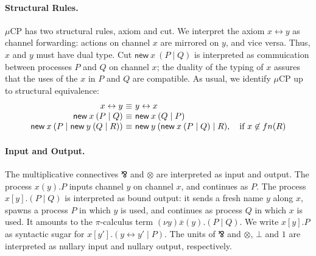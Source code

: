 \documentclass[orivec,envcountsame]{llncs}
\makeatletter
\newcommand{\parr}{\mathbin\bindnasrepma}
\newcommand{\cpdual}[1]{#1^\perp}
\newcommand{\mkwd}[1]{\mathsf{#1}}
\newcommand{\link}[2]{#1 \leftrightarrow #2}
\newcommand{\cut}[4]{\mkwd{new}\:#1 \: (#3 \mid #4)}
\newcommand{\mucp}{$\mu\mathrm{CP}$\xspace}
\newcommand{\ba}{\begin{array}}
\newcommand{\ea}{\end{array}}
\newenvironment{equations}{\[\ba{@{}r@{~}c@{~}l@{}}}{\ea\]}
\makeatother
\begin{document}
\paragraph{Structural Rules.}

\mucp has two structural rules, axiom and cut. We interpret the axiom $\link{x}{y}$ as channel
forwarding: actions on channel $x$ are mirrored on $y$, and vice versa. Thus, $x$ and $y$ must have
dual type. Cut $\cut{x}{A}{P}{Q}$ is interpreted as commuication between processes $P$ and $Q$ on
channel $x$; the duality of the typing of $x$ assures that the uses of the $x$ in $P$ and $Q$ are
compatible. As usual, we identify \mucp up to structural equivalence:
\small\begin{equations}
  \link{x}{y} &\equiv& \link{y}{x} \\
  \cut{x}{A}{P}{Q} &\equiv& \cut{x}{\cpdual{A}}{Q}{P} \\
  \cut{x}{A}{P}{\cut{y}{B}{Q}{R}} &\equiv& \cut{y}{B}{\cut{x}{A}{P}{Q}}{R}, \quad \text{if $x \not\in fn(R)$} \\
\end{equations}\normalsize%


\paragraph{Input and Output.}

The multiplicative connectives $\parr$ and $\otimes$ are interpreted as input and output. The
process $x(y).P$ inputs channel $y$ on channel $x$, and continues as $P$. The process $x[y].(P \mid
Q)$ is interpreted as bound output: it sends a fresh name $y$ along $x$, spawns a process $P$ in
which $y$ is used, and continues as process $Q$ in which $x$ is used.  It amounts to the
$\pi$-calculus term $(\nu y) \overline{x}(y).(P \mid Q)$. We write $x[y].P$ as syntactic sugar for
$x[y'].(\link{y}{y'} \mid P)$. The units of $\parr$ and $\otimes$, $\bot$ and $1$ are interpreted as
nullary input and nullary output, respectively.
\end{document}
